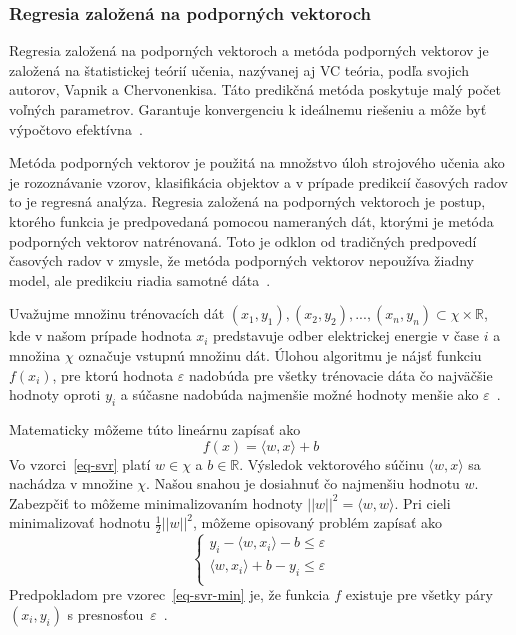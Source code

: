 \documentclass[a4paper,slovak,12pt,appendix]{article}
\begin{document}

\subsubsection{Regresia založená na podporných vektoroch}
Regresia založená na podporných vektoroch a metóda podporných vektorov je
založená na štatistickej teórií učenia, nazývanej aj VC teória, podľa svojich
autorov, Vapnik a Chervonenkisa. Táto predikčná metóda poskytuje malý počet
voľných parametrov. Garantuje konvergenciu k ideálnemu riešeniu a môže byť
výpočtovo efektívna~\cite{Sapankevych2009}.

Metóda podporných vektorov je použitá na množstvo úloh strojového učenia ako je
rozoznávanie vzorov, klasifikácia objektov a v prípade predikcií časových
radov to je regresná analýza. Regresia založená na podporných vektoroch je
postup, ktorého funkcia je predpovedaná pomocou nameraných dát, ktorými je
metóda podporných vektorov natrénovaná. Toto je odklon od tradičných predpovedí
časových radov v zmysle, že metóda podporných vektorov nepoužíva žiadny model,
ale predikciu riadia samotné dáta~\cite{Sapankevych2009}.

Uvažujme množinu trénovacích dát
${(x_1, y_1), (x_2, y_2), ..., (x_n, y_n)} \subset \chi \times \mathbb{R}$, kde
v našom prípade hodnota $x_i$ predstavuje odber elektrickej energie v čase $i$
a množina $\chi$ označuje vstupnú množinu dát. Úlohou algoritmu je nájsť
funkciu  $f(x_i)$, pre ktorú hodnota $\varepsilon$ nadobúda pre všetky
trénovacie dáta čo najväčšie hodnoty oproti $y_i$ a súčasne nadobúda
najmenšie možné hodnoty menšie ako $\varepsilon$~\cite{Smola2004}.

Matematicky môžeme túto lineárnu zapísať ako
\begin{equation}
  f(x) = \langle w, x \rangle +  b
  \label{eq-svr}
\end{equation}
Vo vzorci~\ref{eq-svr} platí $w \in \chi$ a $b \in \mathbb{R}$. Výsledok
vektorového súčinu $\langle w, x \rangle$ sa nachádza v množine $\chi$. Našou
snahou je dosiahnuť čo najmenšiu hodnotu $w$. Zabezpčiť to môžeme
minimalizovaním hodnoty $|| w ||^2 = \langle w, w \rangle$. Pri cieli
minimalizovať hodnotu $\frac{1}{2} || w ||^2$, môžeme opisovaný problém zapísať
ako
\begin{equation}
  \begin{cases}
    y_i - \langle w, x_i \rangle - b \leq \varepsilon \\
    \langle w, x_i \rangle + b - y_i \leq \varepsilon \\
  \end{cases}
  \label{eq-svr-min}
\end{equation}
Predpokladom pre vzorec~\ref{eq-svr-min} je, že funkcia $f$ existuje pre všetky
páry $(x_i, y_i)$ s presnosťou~$\varepsilon$~\cite{Smola2004}.
\end{document}
